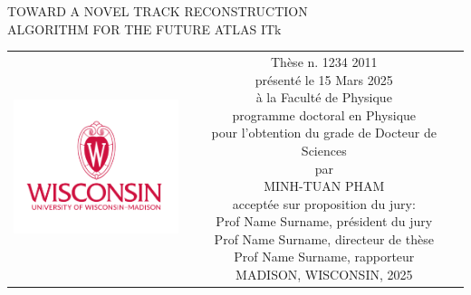 \begin{titlepage}
\begin{center}
\sffamily


\null\vspace{2cm}
{\huge TOWARD A NOVEL TRACK RECONSTRUCTION \\[12pt] ALGORITHM FOR THE FUTURE ATLAS ITk} \\[24pt] 
    
\vfill

\begin{tabular} {cc}
\parbox{0.4\textwidth}{\includegraphics[width=5cm, trim={1.1cm 0 1.cm 0}, clip]{images/uw-logo-vertical-red-print.pdf}}
&
\parbox{0.55\textwidth}{%
	Thèse n. 1234 2011\\
	présenté le 15 Mars 2025\\
	à la Faculté de Physique\\
	programme doctoral en Physique\\ [6pt]
	pour l'obtention du grade de Docteur de Sciences\\
	par\\ [4pt]
	\null \hspace{3em} MINH-TUAN PHAM\\[9pt]
%
\small
acceptée sur proposition du jury:\\[4pt]
%
    Prof Name Surname, président du jury\\
    Prof Name Surname, directeur de thèse\\
    Prof Name Surname, rapporteur\\[12pt]
%
MADISON, WISCONSIN, 2025}
\end{tabular}
\end{center}
\vspace{2cm}
\end{titlepage}



